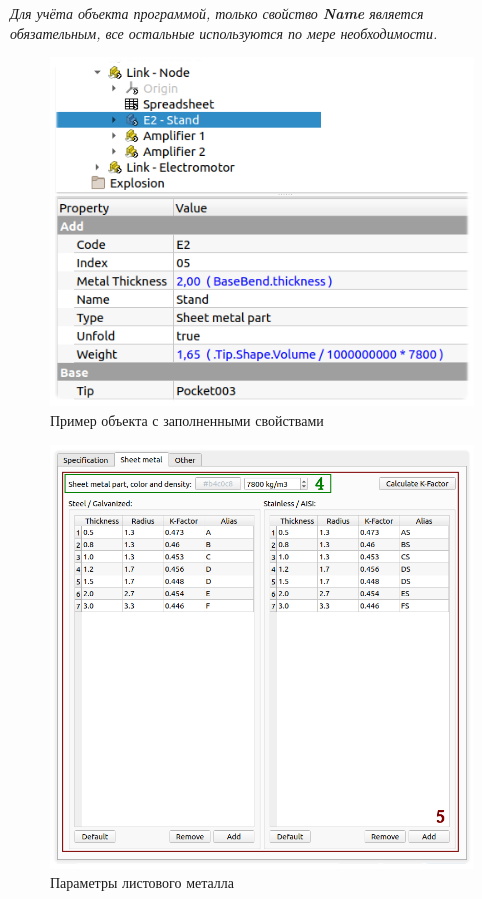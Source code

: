 \documentclass[a4paper,12pt]{article}
\begin{document}
\begin{center}\emph{Для учёта объекта программой, только свойство \textbf{Name} является обязательным, все остальные используются по мере необходимости.}\end{center}

\begin{figure}[htp]
	\centering
	\includegraphics[scale=0.9]{img/properties.png}
	\caption{Пример объекта с заполненными свойствами}
	\label{sec:properties}
\end{figure}


\pagebreak


\begin{figure}[htp]
	\centering
	\includegraphics[width=1\textwidth]{img/pref_sm.png}
	\caption{Параметры листового металла}
	\label{sec:pref_sm}
\end{figure}
\end{document}
